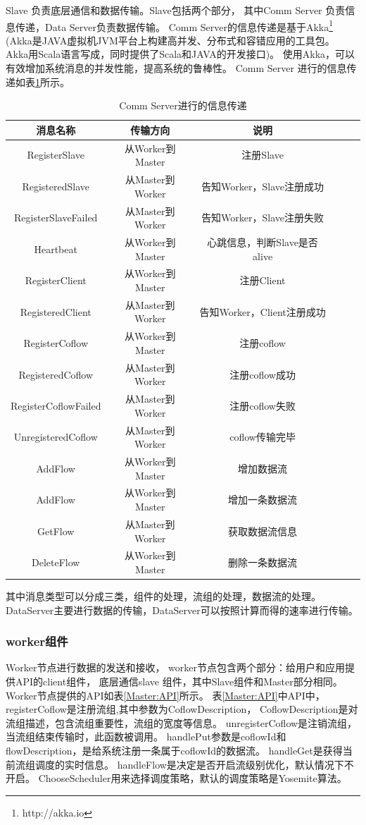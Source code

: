 Slave 负责底层通信和数据传输。Slave包括两个部分，
其中Comm Server 负责信息传递，Data Server负责数据传输。
Comm Server的信息传递是基于Akka\footnote{http://akka.io}
(Akka是JAVA虚拟机JVM平台上构建高并发、分布式和容错应用的工具包。
Akka用Scala语言写成，同时提供了Scala和JAVA的开发接口)。
使用Akka，可以有效增加系统消息的并发性能，提高系统的鲁棒性。
Comm Server 进行的信息传递如表\ref{Master:CommServer}所示。
\begin{table}[h]
\centering
\footnotesize
 \caption{Comm Server进行的信息传递} \label{Master:CommServer}
\begin{tabular}{|c|c|c|c|c|c|} \hline
\toprule
消息名称  &传输方向&说明 \\
\toprule
RegisterSlave & 从Worker到Master&注册Slave\\
\toprule
RegisteredSlave & 从Master到Worker&告知Worker，Slave注册成功\\
\toprule
RegisterSlaveFailed & 从Master到Worker&告知Worker，Slave注册失败\\
\toprule
Heartbeat & 从Worker到Master&心跳信息，判断Slave是否alive\\
\toprule
RegisterClient & 从Worker到Master&注册Client\\
\toprule
RegisteredClient & 从Master到Worker&告知Worker，Client注册成功\\
\toprule
RegisterCoflow & 从Worker到Master&注册coflow\\
\toprule
RegisteredCoflow & 从Master到Worker&注册coflow成功\\
\toprule
RegisterCoflowFailed & 从Master到Worker&注册coflow失败\\
\toprule
UnregisteredCoflow & 从Master到Worker&coflow传输完毕\\
\toprule
AddFlow & 从Worker到Master&增加数据流\\
\toprule
AddFlow & 从Worker到Master&增加一条数据流\\
\toprule
GetFlow & 从Master到Worker&获取数据流信息\\
\toprule
DeleteFlow & 从Worker到Master&删除一条数据流\\
\toprule
\end{tabular}
\end{table}
其中消息类型可以分成三类，组件的处理，流组的处理，数据流的处理。
DataServer主要进行数据的传输，DataServer可以按照计算而得的速率进行传输。


 \subsubsection{worker组件}
 Worker节点进行数据的发送和接收，
 worker节点包含两个部分：给用户和应用提供API的client组件，
 底层通信slave 组件，其中Slave组件和Master部分相同。
 Worker节点提供的API如表\ref{Master:API}所示。
表\ref{Master:API}中API中，registerCoflow是注册流组,其中参数为CoflowDescription，
CoflowDescription是对流组描述，包含流组重要性，流组的宽度等信息。
unregisterCoflow是注销流组，当流组结束传输时，此函数被调用。
handlePut参数是coflowId和flowDescription，是给系统注册一条属于coflowId的数据流。
handleGet是获得当前流组调度的实时信息。
handleFlow是决定是否开启流级别优化，默认情况下不开启。
ChooseScheduler用来选择调度策略，默认的调度策略是Yosemite算法。

